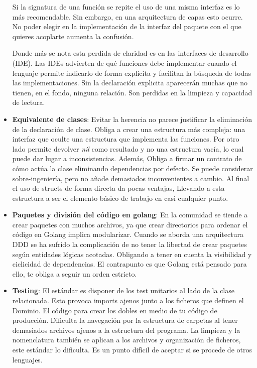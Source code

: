 \begin{itemize}
    Si la signatura de una función se repite el uso de una misma interfaz es lo más recomendable.
    Sin embargo, en una arquitectura de capas esto ocurre.
    No poder elegir en la implementación de la interfaz del paquete con el que quieres acoplarte aumenta la confusión.

    Donde más se nota esta perdida de claridad es en las interfaces de desarrollo (IDE).
    Las IDEs advierten de qué funciones debe implementar cuando el lenguaje permite indicarlo de forma explícita y facilitan la búsqueda de todas las implementaciones.
    Sin la declaración explicita aparecerán muchas que no tienen, en el fondo, ninguna relación.
    Son perdidas en la limpieza y capacidad de lectura.

    \item \textbf{Equivalente de clases}: Evitar la herencia no parece justificar la eliminación de la declaración de clase.
    Obliga a crear una estructura más compleja: una interfaz que oculte una estructura que implementa las funciones.
    Por otro lado permite devolver \textit{nil} como resultado y no una estructura vacía, lo cual puede dar lugar a inconsistencias.
    Además, Obliga a firmar un contrato de cómo actúa la clase eliminando dependencias por defecto.
    Se puede considerar sobre-ingeniería, pero no añade demasiados inconvenientes a cambio.
    Al final el uso de structs de forma directa da pocas ventajas, Llevando a esta estructura a ser el elemento básico de trabajo en casi cualquier punto.

    \item \textbf{Paquetes y división del código en golang}: En la comunidad se tiende a crear paquetes con muchos archivos, ya que crear directorios para ordenar el código en Golang implica modularizar.
    Cuando se aborda una arquitectura DDD se ha sufrido la complicación de no tener la libertad de crear paquetes según entidades lógicas acotadas.
    Obligando a tener en cuenta la visibilidad y ciclicidad de dependencias.
    El contrapunto es que Golang está pensado para ello, te obliga a seguir un orden estricto.

    \item \textbf{Testing}: El estándar es disponer de los test unitarios al lado de la clase relacionada.
    Esto provoca imports ajenos junto a los ficheros que definen el Dominio.
    El código para crear los dobles en medio de tu código de producción.
    Dificulta la navegación por la estructura de carpetas al tener demasiados archivos ajenos a la estructura del programa.
    La limpieza y la nomenclatura también se aplican a los archivos y organización de ficheros, este estándar lo dificulta.
    Es un punto difícil de aceptar si se procede de otros lenguajes.
\end{itemize}

